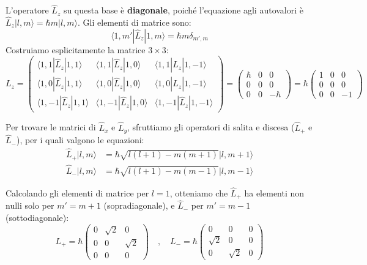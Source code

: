 \documentclass[11pt, a4paper]{article}
\begin{document}
\noindent
L'operatore $\hat{L}_z$ su questa base è \textbf{diagonale}, poiché l'equazione agli autovalori è $\hat{L}_z |l, m\rangle = \hbar m |l, m\rangle$. Gli elementi di matrice sono: %
\begin{equation*}
    \langle 1, m' | \hat{L}_z | 1, m \rangle = \hbar m \delta_{m',m} %
\end{equation*}
Costruiamo esplicitamente la matrice $3 \times 3$: %
\begin{equation}
    L_z = \begin{pmatrix} \langle 1,1|\hat{L}_z|1,1\rangle & \langle 1,1|\hat{L}_z|1,0\rangle & \langle 1,1|\hat{L}_z|1,-1\rangle \\ \langle 1,0|\hat{L}_z|1,1\rangle & \langle 1,0|\hat{L}_z|1,0\rangle & \langle 1,0|\hat{L}_z|1,-1\rangle \\ \langle 1,-1|\hat{L}_z|1,1\rangle & \langle 1,-1|\hat{L}_z|1,0\rangle & \langle 1,-1|\hat{L}_z|1,-1\rangle \end{pmatrix} = \begin{pmatrix} \hbar & 0 & 0 \\ 0 & 0 & 0 \\ 0 & 0 & -\hbar \end{pmatrix} = \hbar \begin{pmatrix} 1 & 0 & 0 \\ 0 & 0 & 0 \\ 0 & 0 & -1 \end{pmatrix} %
\end{equation}

\noindent
Per trovare le matrici di $\hat{L}_x$ e $\hat{L}_y$, sfruttiamo gli operatori di salita e discesa ($\hat{L}_+$ e $\hat{L}_-$), per i quali valgono le equazioni: %
\begin{align*}
    \hat{L}_+ |l, m\rangle &= \hbar \sqrt{l(l+1) - m(m+1)} |l, m+1\rangle \\ %
    \hat{L}_- |l, m\rangle &= \hbar \sqrt{l(l+1) - m(m-1)} |l, m-1\rangle %
\end{align*}

\noindent
Calcolando gli elementi di matrice per $l=1$, otteniamo che $\hat{L}_+$ ha elementi non nulli solo per $m' = m+1$ (sopradiagonale), e $\hat{L}_-$ per $m' = m-1$ (sottodiagonale): %
\begin{equation}
    L_+ = \hbar \begin{pmatrix} 0 & \sqrt{2} & 0 \\ 0 & 0 & \sqrt{2} \\ 0 & 0 & 0 \end{pmatrix} \quad , \quad L_- = \hbar \begin{pmatrix} 0 & 0 & 0 \\ \sqrt{2} & 0 & 0 \\ 0 & \sqrt{2} & 0 \end{pmatrix} %
\end{equation}
\end{document}
